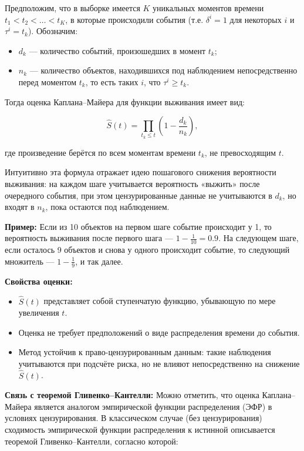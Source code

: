 \documentclass[a4paper,14pt,oneside,openany]{memoir}
\begin{document}
Предположим, что в выборке имеется $K$ уникальных моментов времени $t_1 < t_2 < \dots < t_K$, в которые происходили события (т.е. $\delta^i = 1$ для некоторых $i$ и $\tau^i = t_k$). Обозначим:
\begin{itemize}
	\item $d_k$ — количество событий, произошедших в момент $t_k$;
	\item $n_k$ — количество объектов, находившихся под наблюдением непосредственно перед моментом $t_k$, то есть таких $i$, что $\tau^i \geq t_k$.
\end{itemize}

Тогда оценка Каплана--Майера для функции выживания имеет вид:

\begin{equation}
	\hat{S}(t) = \prod_{t_k \leq t} \left(1 - \frac{d_k}{n_k} \right),
\end{equation}

где произведение берётся по всем моментам времени $t_k$, не превосходящим $t$.

Интуитивно эта формула отражает идею пошагового снижения вероятности выживания: на каждом шаге учитывается вероятность «выжить» после очередного события, при этом цензурированные данные не учитываются в $d_k$, но входят в $n_k$, пока остаются под наблюдением.

\vspace{1em}
\noindent
\textbf{Пример:} Если из 10 объектов на первом шаге событие происходит у 1, то вероятность выживания после первого шага — $1 - \frac{1}{10} = 0.9$. На следующем шаге, если осталось 9 объектов и снова у одного происходит событие, то следующий множитель — $1 - \frac{1}{9}$, и так далее.

\vspace{1em}
\noindent
\textbf{Свойства оценки:}
\begin{itemize}
	\item $\hat{S}(t)$ представляет собой ступенчатую функцию, убывающую по мере увеличения $t$.
	\item Оценка не требует предположений о виде распределения времени до события.
	\item Метод устойчив к право-цензурированным данным: такие наблюдения учитываются при подсчёте риска, но не влияют непосредственно на снижение $\hat{S}(t)$.
\end{itemize}

\vspace{1em}
\noindent
\textbf{Связь с теоремой Гливенко--Кантелли:} Можно отметить, что оценка Каплана--Майера является аналогом эмпирической функции распределения (ЭФР) в условиях цензурирования. В классическом случае (без цензурирования) сходимость эмпирической функции распределения к истинной описывается теоремой Гливенко--Кантелли, согласно которой:
\end{document}
